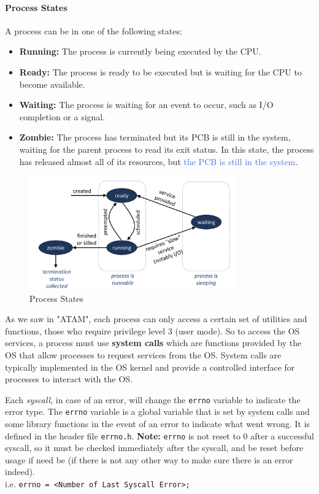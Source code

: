 \documentclass[openany,12pt]{book}
\newcommand{\code}[1]{\texttt{#1}}
\newcommand{\blue}[1]{\textcolor{RoyalBlue}{#1}}
\begin{document}
\paragraph{Process States}
A process can be in one of the following states:
\begin{itemize}
    \item \textbf{Running:} The process is currently being executed by the CPU.
    \item \textbf{Ready:} The process is ready to be executed but is waiting for the CPU to become available.
    \item \textbf{Waiting:} The process is waiting for an event to occur, such as I/O completion or a signal.
    \item \textbf{Zombie:} The process has terminated but its PCB is still in the system, waiting for the parent process to read its exit status. In this state, the process has released almost all of its resources, but \blue{the PCB is still in the system}.
\end{itemize}



\begin{figure}
    \centering
    \includegraphics[width=0.8\textwidth]{../Assets/process_states.png}
    \caption{Process States}
    \label{fig:process_states}
\end{figure}


As we saw in "ATAM", each process can only access a certain set of utilities and functions, those who require privilege level 3 (user mode). So to access the OS services, a process must use \textbf{system calls} which are functions provided by the OS that allow processes to request services from the OS. System calls are typically implemented in the OS kernel and provide a controlled interface for processes to interact with the OS.

\vspace{1em}

Each \textit{syscall}, in case of an error, will change the \texttt{errno} variable to indicate the error type. The \texttt{errno} variable is a global variable that is set by system calls and some library functions in the event of an error to indicate what went wrong. It is defined in the header file \texttt{errno.h}. {\color{blue}\textbf{Note:} \texttt{errno} is not reset to 0 after a successful syscall, so it must be checked immediately after the syscall, and be reset before usage if need be} (if there is not any other way to make sure there is an error indeed).\\
i.e. \code{errno = <Number of Last Syscall Error>;}
\end{document}
